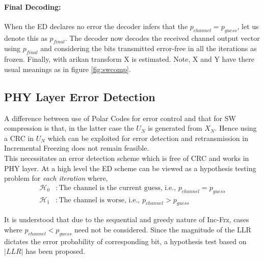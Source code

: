 \documentclass[
11pt, %
a4paper, %
oneside, %
headinclude,footinclude, %
BCOR5mm, %
]{scrartcl}
\begin{document}
\paragraph{Final Decoding:}When the ED declares no error the decoder infers that the $p_{channel}=p_{guess}$, let us denote this as $p_{final}$. The decoder now  decodes the received channel output vector using $p_{final}$ and considering the bits transmitted error-free in all the iterations as frozen. Finally, with arikan transform X is estimated.
Note, X and Y have there usual meanings as in figure \ref{fig:swcomp}. 


\subsection{PHY Layer Error Detection} 

A difference between use of Polar Codes for error control and that for SW compression is that, in the latter case the $U_N$ is generated from $X_N$. Hence using a CRC in $U_N$ which can be exploited for error detection and retransmission in Incremental Freezing does not remain feasible.\\This necessitates an error detection scheme which is free of CRC and works in PHY layer. At a high level the ED scheme can be viewed as a hypothesis testing problem for \emph{each iteration} where,
\begin{align*}
\mathcal{H}_0 & :\text{The channel is the current guess, i.e., } p_{channel}=p_{guess}\\
\mathcal{H}_1 & :\text{The channel is worse, i.e., } p_{channel} > p_{guess}
\end{align*}

It is understood that due to the sequential and greedy nature of Inc-Frz, cases where $p_{channel} < p_{guess}$ need not be considered. Since the magnitude of the LLR dictates the error probability of corresponding bit, a hypothesis test based on $|LLR|$ has been proposed.
\end{document}
